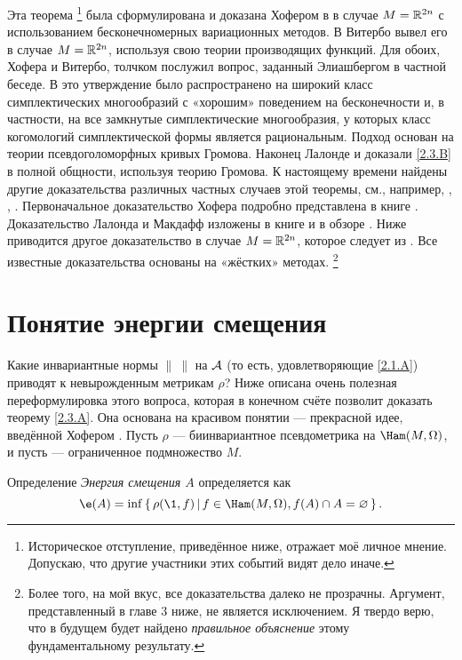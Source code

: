 Эта теорема%
\footnote{Историческое отступление, приведённое ниже, отражает моё личное мнение.
Допускаю, что другие участники этих событий видят дело иначе.}
была сформулирована и доказана Хофером в \cite{H1} в случае $M = \mathbb{R}^{2n}$ с использованием бесконечномерных вариационных методов.
В \cite{V1} Витербо вывел его в случае $M = \mathbb{R}^{2n}$, используя свою теории производящих функций.
Для обоих, Хофера и Витербо, толчком послужил вопрос, заданный Элиашбергом в частной беседе.
В \cite{P1} это утверждение было распространено на широкий класс симплектических многообразий с «хорошим» поведением на бесконечности и, в частности, на все замкнутые симплектические многообразия, у которых класс когомологий симплектической формы является рациональным.
Подход \cite{P1} основан на теории псевдоголоморфных кривых Громова.
Наконец \cite{LM1} Лалонде и  доказали \ref{2.3.B} в полной общности, используя теорию Громова.
К настоящему времени найдены другие доказательства различных частных случаев этой теоремы, см., например, \cite{Ch}, \cite{O3}, \cite{Sch3}.
Первоначальное доказательство Хофера подробно представлена в книге
\cite{HZ}.
Доказательство Лалонда и Макдафф изложены в книге \cite{MS} и в обзоре \cite{L}.
Ниже приводится другое доказательство в случае $M = \mathbb{R}^{2n}$, которое следует из \cite{P1}.
Все известные доказательства основаны на «жёстких» методах.%
\footnote{Более того, на мой вкус, все доказательства далеко не прозрачны.
Аргумент, представленный в главе 3 ниже, не является исключением.
Я твердо верю, что в будущем будет найдено \emph{правильное объяснение} этому фундаментальному результату.}

\section{Понятие энергии смещения}\label{sec:2.4}

Какие инвариантные нормы $\|\ \|$ на $\mathcal{A}$ (то есть, удовлетворяющие \ref{2.1.A}) приводят к невырожденным метрикам $\rho$?
Ниже описана очень полезная переформулировка этого вопроса, которая в конечном счёте позволит доказать теорему \ref{2.3.A}.
Она основана на красивом понятии  --- прекрасной идее, введённой Хофером \cite{H1}.
Пусть $\rho$ --- биинвариантное псевдометрика на $\Ham (M, \Omega)$, и пусть  --- ограниченное подмножество $M$.

\begin{thm*}{Определение}
\emph{Энергия смещения $A$} определяется как
\[\e(A) = \inf \set{\rho (\1, f)}{f \in \Ham (M, \Omega), f (A) \cap A = \emptyset}.\]
\end{thm*}

